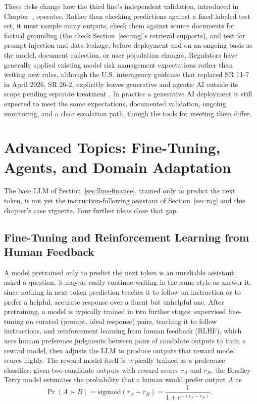 \documentclass[../ai_in_finance]{subfiles}
\begin{document}
These risks change how the third line's independent validation, introduced in Chapter~, operates. Rather than checking predictions against a fixed labeled test set, it must sample many outputs, check them against source documents for factual grounding (the check Section~\ref{sec:rag}'s retrieval supports), and test for prompt injection and data leakage, before deployment and on an ongoing basis as the model, document collection, or user population changes. Regulators have generally applied existing model risk management expectations rather than writing new rules, although the U.S. interagency guidance that replaced SR 11-7 in April 2026, SR 26-2, explicitly leaves generative and agentic AI outside its scope pending separate treatment \parencite{frb2026revised}. In practice a generative AI deployment is still expected to meet the same expectations, documented validation, ongoing monitoring, and a clear escalation path, though the tools for meeting them differ.

\section{Advanced Topics: Fine-Tuning, Agents, and Domain Adaptation}
\label{sec:advanced-nlp}

The base LLM of Section~\ref{sec:llms-finance}, trained only to predict the next token, is not yet the instruction-following assistant of Section~\ref{sec:rag} and this chapter's case vignette. Four further ideas close that gap.

\subsection{Fine-Tuning and Reinforcement Learning from Human Feedback}
\label{sec:rlhf}

A model pretrained only to predict the next token is an unreliable assistant: asked a question, it may as easily continue writing in the same style as answer it, since nothing in next-token prediction teaches it to follow an instruction or to prefer a helpful, accurate response over a fluent but unhelpful one. After pretraining, a model is typically trained in two further stages: supervised fine-tuning on curated (prompt, ideal response) pairs,
teaching it to follow instructions, and reinforcement learning from human feedback (RLHF), which uses human preference judgments between pairs of candidate outputs to train a reward model, then adjusts the LLM
to produce outputs that reward model scores highly. The reward model itself is typically trained as a preference classifier: given two candidate
outputs with reward scores $r_A$ and $r_B$, the Bradley-Terry model estimates the probability that a human would prefer output $A$ as
\begin{equation}
\Pr(A \succ B) = \text{sigmoid}(r_A - r_B) = \frac{1}{1+e^{-(r_A - r_B)}}.
\label{eq:nlp-reward-model}
\end{equation}
\end{document}
